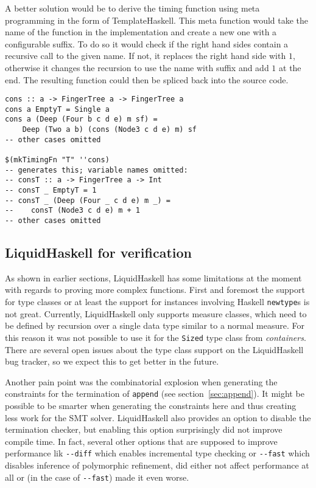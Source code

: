 \documentclass[sigplan,screen]{acmart}
\begin{document}
A better solution would be to derive the timing function using meta programming in the form of TemplateHaskell. This meta function would take the name of the function in the implementation and create a new one with a configurable suffix. To do so it would check if the right hand sides contain a recursive call to the given name. If not, it replaces the right hand side with $1$, otherwise it changes the recursion to use the name with suffix and add $1$ at the end. The resulting function could then be spliced back into the source code.

\begin{lstlisting}
cons :: a -> FingerTree a -> FingerTree a
cons a EmptyT = Single a
cons a (Deep (Four b c d e) m sf) =
    Deep (Two a b) (cons (Node3 c d e) m) sf
-- other cases omitted

$(mkTimingFn "T" ''cons)
-- generates this; variable names omitted:
-- consT :: a -> FingerTree a -> Int
-- consT _ EmptyT = 1
-- consT _ (Deep (Four _ c d e) m _) =
--    consT (Node3 c d e) m + 1
-- other cases omitted
\end{lstlisting}

\subsection{LiquidHaskell for verification}

As shown in earlier sections, LiquidHaskell has some limitations at the moment with regards to proving more complex functions. First and foremost the support for type classes or at least the support for instances involving Haskell \texttt{newtype}s is not great. Currently, LiquidHaskell only supports measure classes, which need to be defined by recursion over a single data type similar to a normal measure. For this reason it was not possible to use it for the \texttt{Sized} type class from \textit{containers}. There are several open issues about the type class support on the LiquidHaskell bug tracker, so we expect this to get better in the future.

Another pain point was the combinatorial explosion when generating the constraints for the termination of \texttt{append} (see section~\ref{sec:append}). It might be possible to be smarter when generating the constraints here and thus creating less work for the SMT solver. LiquidHaskell also provides an option to disable the termination checker, but enabling this option surprisingly did not improve compile time. In fact, several other options that are supposed to improve performance lik \texttt{{-}{-}diff} which enables incremental type checking or \texttt{{-}{-}fast} which disables inference of polymorphic refinement, did either not affect performance at all or (in the case of \texttt{{-}{-}fast}) made it even worse.
\end{document}
